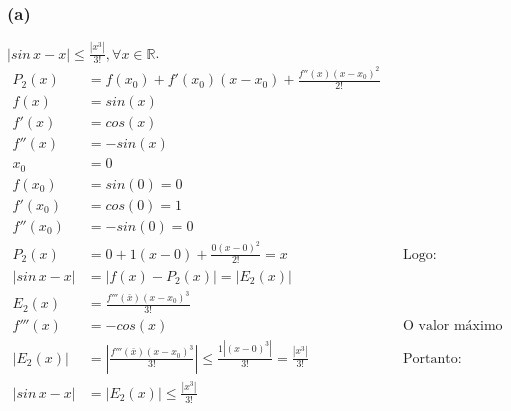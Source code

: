\documentclass{article}
\begin{document}
\subsubsection{(a)}
$|sin \, x - x| \leq \frac{|x^3|}{3!}, \forall x \in \mathbb{R}$.
\begin{align}
  P_2(x)
  &= f(x_0) + f'(x_0)(x - x_0) + \frac{f''(x)(x - x_0)^2}{2!} \\
  f(x)
  &= sin(x) \\
  f'(x)
  &= cos(x) \\
  f''(x)
  &= -sin(x) \\
  x_0
  &= 0 \\
  f(x_0)
  &= sin(0)
  = 0 \\
  f'(x_0)
  &= cos(0)
  = 1 \\
  f''(x_0)
  &= -sin(0)
  = 0 \\
  P_2(x)
  &= 0 + 1(x - 0) + \frac{0(x - 0)^2}{2!}
  = x
  && \text{Logo:} \\
  |sin \, x - x|
  &= |f(x) - P_2(x)|
  = |E_2(x)| \\
  E_2(x)
  &= \frac{f'''(\bar{x}) (x - x_0)^3}{3!} \\
  f'''(x)
  &= -cos(x)
  && \text{O valor máximo absoluto dessa função é 1, logo:} \\
  |E_2(x)|
  &= \left|\frac{f'''(\bar{x}) (x - x_0)^3}{3!}\right|
  \leq \frac{1\left|(x - 0)^3\right|}{3!}
  = \frac{|x^3|}{3!}
  && \text{Portanto:} \\
  |sin \, x - x|
  &= |E_2(x)|
  \leq \frac{|x^3|}{3!}
\end{align}
\setcounter{equation}{0}
\clearpage
\end{document}
